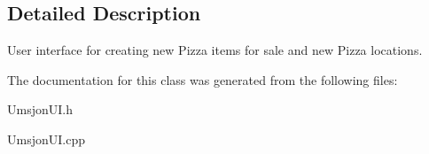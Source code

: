 \subsection{Detailed Description}
User interface for creating new Pizza items for sale and new Pizza locations. 



The documentation for this class was generated from the following files:\begin{CompactItemize}
\item 
Umsjon\-UI.h\item 
Umsjon\-UI.cpp\end{CompactItemize}
